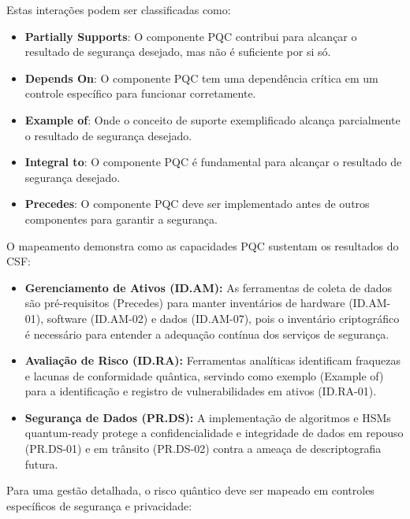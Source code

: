         Estas interações podem ser classificadas como:

        \begin{itemize}
            \item \textbf{Partially Supports}: O componente PQC contribui para alcançar o resultado de segurança desejado, mas não é suficiente por si só.
            \item \textbf{Depends On}: O componente PQC tem uma dependência crítica em um controle específico para funcionar corretamente.
        \end{itemize}\cite{nistCSWP48}

        \begin{itemize}
            \item \textbf{Example of}: Onde o conceito de suporte exemplificado alcança parcialmente o resultado de segurança desejado.
            \item \textbf{Integral to}: O componente PQC é fundamental para alcançar o resultado de segurança desejado.
            \item \textbf{Precedes}: O componente PQC deve ser implementado antes de outros componentes para garantir a segurança.
        \end{itemize}\cite{nistCSWP48}

        O mapeamento demonstra como as capacidades PQC sustentam os resultados do CSF:\@

        \begin{itemize}
        \item \textbf{Gerenciamento de Ativos (ID.AM):} As ferramentas de coleta de dados são pré-requisitos (Precedes) para manter inventários de hardware (ID.AM-01), software (ID.AM-02) e dados (ID.AM-07), pois o inventário criptográfico é necessário para entender a adequação contínua dos serviços de segurança.
        \item \textbf{Avaliação de Risco (ID.RA):} Ferramentas analíticas identificam fraquezas e lacunas de conformidade quântica, servindo como exemplo (Example of) para a identificação e registro de vulnerabilidades em ativos (ID.RA-01).
        \item \textbf{Segurança de Dados (PR.DS):} A implementação de algoritmos e HSMs quantum-ready protege a confidencialidade e integridade de dados em repouso (PR.DS-01) e em trânsito (PR.DS-02) contra a ameaça de descriptografia futura.
        \end{itemize}\cite{nistCSWP48}

        Para uma gestão detalhada, o risco quântico deve ser mapeado em controles específicos de segurança e privacidade:

